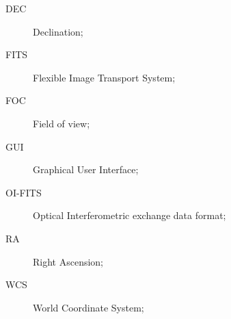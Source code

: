 \documentclass{article}
\begin{document}
\begin{description}
\item[DEC] Declination;
\item[FITS] Flexible Image Transport System;
\item[FOC] Field of view;
\item[GUI] Graphical User Interface;
\item[OI-FITS] Optical Interferometric exchange data format;
\item[RA] Right Ascension;
\item[WCS] World Coordinate System;
\end{description}



\end{document}

